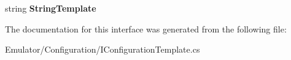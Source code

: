 \begin{DoxyCompactItemize}
\item 
\hypertarget{interface_snowflake_1_1_emulator_1_1_configuration_1_1_i_configuration_template_a62a356efa3c85d1fe554b78e64d32be8}{}string {\bfseries String\+Template}\label{interface_snowflake_1_1_emulator_1_1_configuration_1_1_i_configuration_template_a62a356efa3c85d1fe554b78e64d32be8}

\end{DoxyCompactItemize}


The documentation for this interface was generated from the following file\+:\begin{DoxyCompactItemize}
\item 
Emulator/\+Configuration/I\+Configuration\+Template.\+cs\end{DoxyCompactItemize}
